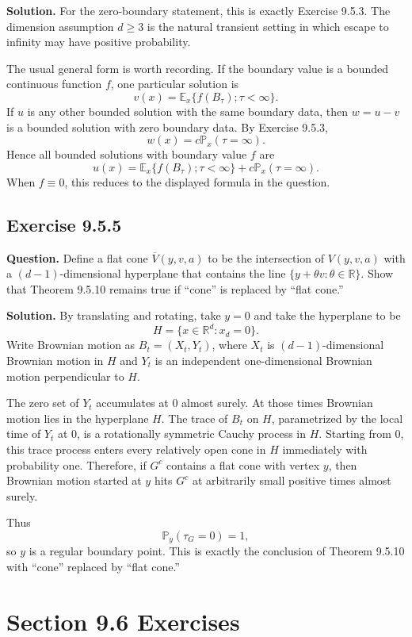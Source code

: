 \documentclass[11pt]{article}
\newcommand{\R}{\mathbb{R}}
\newcommand{\Prob}{\mathbb{P}}
\newcommand{\E}{\mathbb{E}}
\begin{document}
\noindent\textbf{Solution.}
For the zero-boundary statement, this is exactly Exercise 9.5.3.  The
dimension assumption $d\ge3$ is the natural transient setting in which
escape to infinity may have positive probability.

The usual general form is worth recording.  If the boundary value is a
bounded continuous function $f$, one particular solution is
\[
  v(x)=\E_x\{f(B_\tau);\tau<\infty\}.
\]
If $u$ is any other bounded solution with the same boundary data, then
$w=u-v$ is a bounded solution with zero boundary data.  By Exercise
9.5.3,
\[
  w(x)=c\Prob_x(\tau=\infty).
\]
Hence all bounded solutions with boundary value $f$ are
\[
  u(x)=
  \E_x\{f(B_\tau);\tau<\infty\}
  +
  c\Prob_x(\tau=\infty).
\]
When $f\equiv0$, this reduces to the displayed formula in the question.

\subsection*{Exercise 9.5.5}

\noindent\textbf{Question.}
Define a flat cone $\overline V(y,v,a)$ to be the intersection of
$V(y,v,a)$ with a $(d-1)$-dimensional hyperplane that contains the line
$\{y+\theta v:\theta\in\R\}$.  Show that Theorem 9.5.10 remains true if
``cone'' is replaced by ``flat cone.''

\noindent\textbf{Solution.}
By translating and rotating, take $y=0$ and take the hyperplane to be
\[
  H=\{x\in\R^d:x_d=0\}.
\]
Write Brownian motion as $B_t=(X_t,Y_t)$, where $X_t$ is
$(d-1)$-dimensional Brownian motion in $H$ and $Y_t$ is an independent
one-dimensional Brownian motion perpendicular to $H$.

The zero set of $Y_t$ accumulates at $0$ almost surely.  At those times
Brownian motion lies in the hyperplane $H$.  The trace of $B_t$ on
$H$, parametrized by the local time of $Y_t$ at $0$, is a rotationally
symmetric Cauchy process in $H$.  Starting from $0$, this trace process
enters every relatively open cone in $H$ immediately with probability
one.  Therefore, if $G^c$ contains a flat cone with vertex $y$, then
Brownian motion started at $y$ hits $G^c$ at arbitrarily small positive
times almost surely.

Thus
\[
  \Prob_y(\tau_G=0)=1,
\]
so $y$ is a regular boundary point.  This is exactly the conclusion of
Theorem 9.5.10 with ``cone'' replaced by ``flat cone.''

\section*{Section 9.6 Exercises}
\end{document}
